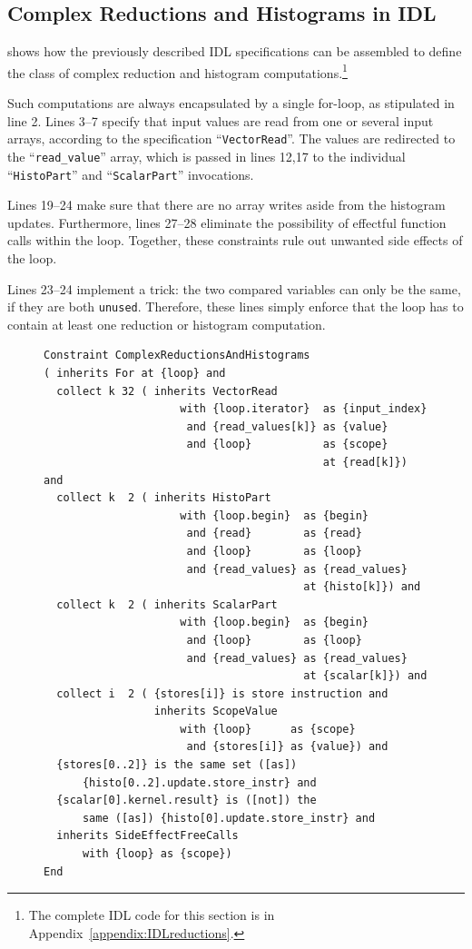 \subsection{Complex Reductions and Histograms in IDL}

     shows how the previously described IDL specifications
    can be assembled to define the class of complex reduction and histogram
    computations.\footnote{The complete IDL code for this section is in
    Appendix~\ref{appendix:IDLreductions}.}

    Such computations are always encapsulated by a single for-loop, as
    stipulated in line 2.
    Lines 3--7 specify that input values are read from one or several input
    arrays, according to the specification ``{\tt VectorRead}''.
    The values are redirected to the ``{\tt read\_value}'' array, which is
    passed in lines 12,17 to the individual ``{\tt HistoPart}'' and
    ``{\tt ScalarPart}'' invocations.

    Lines 19--24 make sure that there are no array writes aside from the
    histogram updates.
    Furthermore, lines 27--28 eliminate the possibility of effectful function
    calls within the loop.
    Together, these constraints rule out unwanted side effects of the loop.

    Lines 23--24 implement a trick: the two compared variables can only be the
    same, if they are both {\tt unused}.
    Therefore, these lines simply enforce that the loop has to contain at least
    one reduction or histogram computation.

\begin{figure}[p]
\begin{lstlisting}[language=IDL,label={IDLcomplexred},caption=
   {Complex reductions and histograms as an IDL specification}]
Constraint ComplexReductionsAndHistograms
( inherits For at {loop} and
  collect k 32 ( inherits VectorRead
                     with {loop.iterator}  as {input_index}
                      and {read_values[k]} as {value}
                      and {loop}           as {scope}
                                           at {read[k]}) and
  collect k  2 ( inherits HistoPart
                     with {loop.begin}  as {begin}
                      and {read}        as {read}
                      and {loop}        as {loop}
                      and {read_values} as {read_values}
                                        at {histo[k]}) and
  collect k  2 ( inherits ScalarPart
                     with {loop.begin}  as {begin}
                      and {loop}        as {loop}
                      and {read_values} as {read_values}
                                        at {scalar[k]}) and
  collect i  2 ( {stores[i]} is store instruction and
                 inherits ScopeValue
                     with {loop}      as {scope}
                      and {stores[i]} as {value}) and
  {stores[0..2]} is the same set ([as])
      {histo[0..2].update.store_instr} and
  {scalar[0].kernel.result} is ([not]) the
      same ([as]) {histo[0].update.store_instr} and
  inherits SideEffectFreeCalls
      with {loop} as {scope})
End
\end{lstlisting}
\end{figure}

